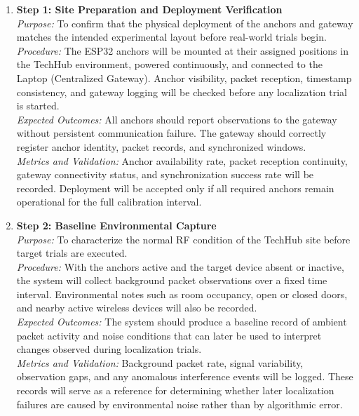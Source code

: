 \begin{enumerate}
    \item \textbf{Step 1: Site Preparation and Deployment Verification} \\
    \textit{Purpose:} To confirm that the physical deployment of the anchors and gateway matches the intended experimental layout before real-world trials begin. \\
    \textit{Procedure:} The ESP32 anchors will be mounted at their assigned positions in the TechHub environment, powered continuously, and connected to the Laptop (Centralized Gateway). Anchor visibility, packet reception, timestamp consistency, and gateway logging will be checked before any localization trial is started. \\
    \textit{Expected Outcomes:} All anchors should report observations to the gateway without persistent communication failure. The gateway should correctly register anchor identity, packet records, and synchronized windows. \\
    \textit{Metrics and Validation:} Anchor availability rate, packet reception continuity, gateway connectivity status, and synchronization success rate will be recorded. Deployment will be accepted only if all required anchors remain operational for the full calibration interval.

    \item \textbf{Step 2: Baseline Environmental Capture} \\
    \textit{Purpose:} To characterize the normal RF condition of the TechHub site before target trials are executed. \\
    \textit{Procedure:} With the anchors active and the target device absent or inactive, the system will collect background packet observations over a fixed time interval. Environmental notes such as room occupancy, open or closed doors, and nearby active wireless devices will also be recorded. \\
    \textit{Expected Outcomes:} The system should produce a baseline record of ambient packet activity and noise conditions that can later be used to interpret changes observed during localization trials. \\
    \textit{Metrics and Validation:} Background packet rate, signal variability, observation gaps, and any anomalous interference events will be logged. These records will serve as a reference for determining whether later localization failures are caused by environmental noise rather than by algorithmic error.


\end{enumerate}
